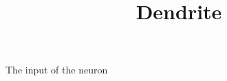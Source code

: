 \documentclass[a4paper]{article}
\title{Dendrite}
\date{}
\begin{document}
    \maketitle
    The input of the neuron
\end{document}
